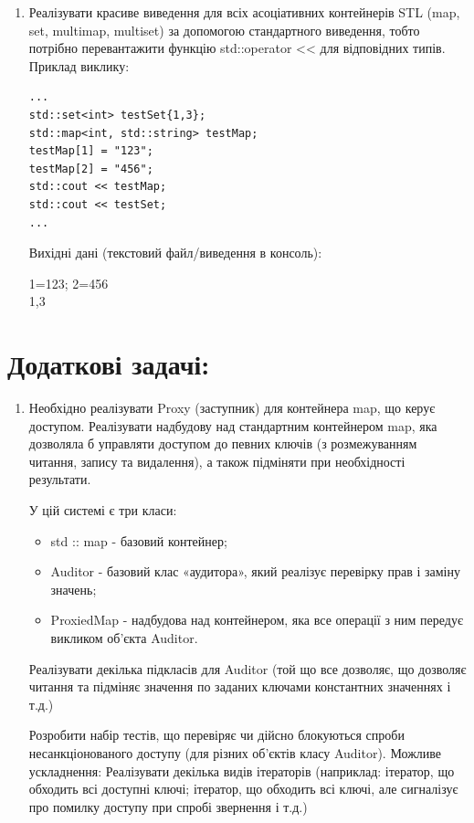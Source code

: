 \documentclass[a5paper,titlepage,openany,twoside,
]
{book_unv}%
\begin{document}
\begin{enumerate}
\item
Реалізувати красиве виведення для всіх асоціативних контейнерів STL
(map, set, multimap, multiset) за допомогою стандартного виведення, 
тобто потрібно перевантажити функцію std::operator \textless{}\textless{} 
для відповідних типів. Приклад виклику: 
\begin{verbatim}
...
std::set<int> testSet{1,3};
std::map<int, std::string> testMap;
testMap[1] = "123";
testMap[2] = "456";
std::cout << testMap;
std::cout << testSet;
...
\end{verbatim}
Вихідні дані (текстовий файл/виведення в консоль):

1=123; 2=456\\
1,3
\end{enumerate}

\section{Додаткові задачі:}
\begin{enumerate}
\def\labelenumi{\arabic{enumi})}
\setcounter{enumi}{20}

\item
Необхідно реалізувати Proxy (заступник) для контейнера map, що керує доступом.
Реалізувати надбудову над стандартним контейнером map, яка дозволяла б управляти доступом до певних ключів 
(з розмежуванням читання, запису та видалення), а також підміняти при необхідності результати.

У цій системі є три класи:
\begin{itemize}
\item
    std :: map - базовий контейнер;
\item
    Auditor - базовий клас «аудитора», який реалізує перевірку прав і заміну значень;
\item
    ProxiedMap - надбудова над контейнером, яка все операції з ним передує викликом об'єкта Auditor.
\end{itemize}
Реалізувати декілька підкласів для Auditor (той що все дозволяє, що дозволяє читання та підміняє значення по заданих ключами 
константних значеннях і т.д.)

Розробити набір тестів, що перевіряє чи дійсно блокуються спроби несанкціонованого доступу (для різних об'єктів класу Auditor).
Можливе ускладнення:
Реалізувати декілька видів ітераторів (наприклад: ітератор, що обходить всі доступні ключі; 
ітератор, що обходить всі ключі, але сигналізує про помилку доступу при спробі звернення і т.д.) 
\end{enumerate}
\end{document}
